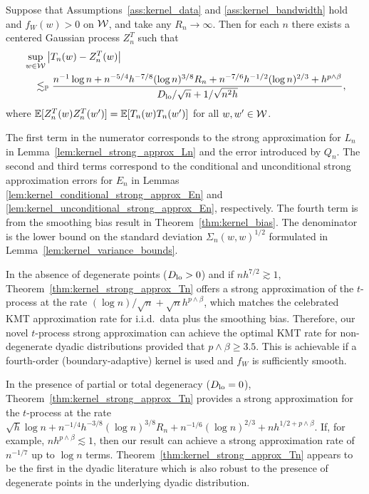 \begin{theorem}
  \label{thm:kernel_strong_approx_Tn}

  Suppose that Assumptions~\ref{ass:kernel_data} and \ref{ass:kernel_bandwidth}
  hold and $f_W(w) > 0$ on $\mathcal{W}$, and take any $R_n \to \infty$. Then for each
  $n$ there exists a centered Gaussian process $Z_n^{T}$ such that
  \begin{align*}
    &\sup_{w \in \mathcal{W}} \left| T_n(w) - Z_n^{T}(w) \right| \\
    &\quad\lesssim_{\mathbb{P}}
    \frac{
      n^{-1} \log n
      + n^{-5/4} h^{-7/8} (\log n)^{3/8} R_n
      + n^{-7/6} h^{-1/2} (\log n)^{2/3}
    + h^{p\wedge\beta}}
    {D_{\textup{lo}}/\sqrt{n} + 1/\sqrt{n^2h}},
  \end{align*}
  where $\mathbb{E}[Z_n^T(w)Z_n^T(w')] = \mathbb{E}[T_n(w)T_n(w')]$ for all $w,w' \in \mathcal{W}$.
\end{theorem}

The first term in the numerator corresponds to the strong approximation for
$L_n$ in Lemma~\ref{lem:kernel_strong_approx_Ln} and the error introduced by
$Q_n$.
The second and third terms correspond to the conditional and unconditional
strong approximation errors for $E_n$ in Lemmas
\ref{lem:kernel_conditional_strong_approx_En} and
\ref{lem:kernel_unconditional_strong_approx_En}, respectively.
The fourth term is from
the smoothing bias result in Theorem~\ref{thm:kernel_bias}. The denominator is
the lower bound on the standard deviation $\Sigma_n(w,w)^{1/2}$ formulated in
Lemma~\ref{lem:kernel_variance_bounds}.

In the absence of degenerate points ($D_{\textup{lo}} > 0$) and if $n h^{7/2}\gtrsim 1$,
Theorem~\ref{thm:kernel_strong_approx_Tn} offers a strong approximation of the
$t$-process at the rate $(\log n)/\sqrt{n}+\sqrt{n}h^{p\wedge\beta}$, which
matches the celebrated KMT approximation rate for i.i.d.\ data plus the
smoothing bias. Therefore, our novel $t$-process strong approximation can
achieve the optimal KMT rate for non-degenerate dyadic distributions provided
that $p\wedge\beta \geq 3.5$. This is achievable if a fourth-order
(boundary-adaptive) kernel is used and $f_W$ is sufficiently smooth.

In the presence of partial or total degeneracy ($D_{\textup{lo}} =0$),
Theorem~\ref{thm:kernel_strong_approx_Tn} provides a strong approximation for
the
$t$-process at the rate
$\sqrt{h}\log n + n^{-1/4}h^{-3/8}(\log n)^{3/8} R_n + n^{-1/6}(\log n)^{2/3}
+ n h^{1/2+p\wedge\beta}$. If, for example, $n h^{p\wedge\beta}\lesssim 1$,
then our result can achieve a strong approximation rate of $n^{-1/7}$ up to
$\log n $ terms. Theorem~\ref{thm:kernel_strong_approx_Tn} appears to be the
first in the dyadic literature which is also robust to the presence of
degenerate points in the underlying dyadic distribution.

